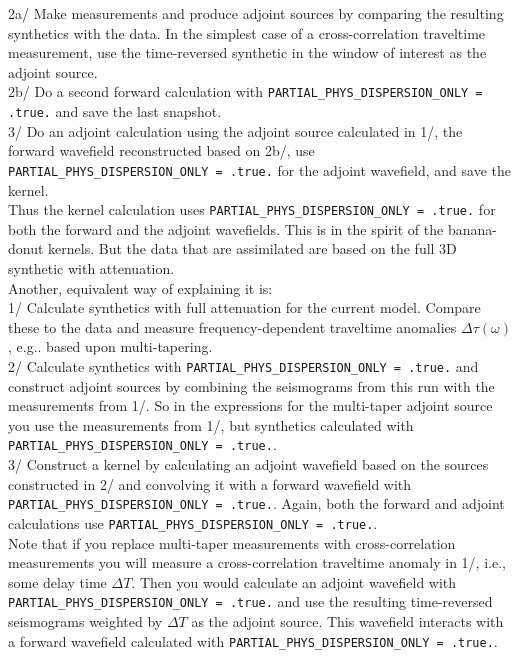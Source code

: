 \documentclass[oneside,english]{book}
\begin{document}
\begin{description}
2a/ Make measurements and produce adjoint sources by comparing the resulting synthetics with the data. In the simplest case of a cross-correlation traveltime measurement, use the time-reversed synthetic in the window of interest as the adjoint source.\\
2b/ Do a second forward calculation with \texttt{PARTIAL\_PHYS\_DISPERSION\_ONLY = .true.} and save the last snapshot.\\
3/ Do an adjoint calculation using the adjoint source calculated in 1/, the forward wavefield reconstructed based on 2b/, use \texttt{PARTIAL\_PHYS\_DISPERSION\_ONLY = .true.} for the adjoint wavefield, and save the kernel.\\
Thus the kernel calculation uses \texttt{PARTIAL\_PHYS\_DISPERSION\_ONLY = .true.} for both the forward and the adjoint wavefields. This is in the spirit of the banana-donut kernels. But the data that are assimilated are based on the full 3D synthetic with attenuation.\\
%
Another, equivalent way of explaining it is:\\
1/ Calculate synthetics with full attenuation for the current model. Compare these to the data and measure frequency-dependent traveltime anomalies $\Delta \tau(\omega)$, e.g.. based upon multi-tapering.\\
2/ Calculate synthetics with \texttt{PARTIAL\_PHYS\_DISPERSION\_ONLY = .true.} and construct adjoint sources by combining the seismograms from this run with the measurements from 1/. So in the expressions for the multi-taper adjoint source you use the measurements from 1/, but synthetics calculated with \texttt{PARTIAL\_PHYS\_DISPERSION\_ONLY = .true.}.\\
3/ Construct a kernel by calculating an adjoint wavefield based on the sources constructed in 2/ and convolving it with a forward wavefield with \texttt{PARTIAL\_PHYS\_DISPERSION\_ONLY = .true.}. Again, both the forward and adjoint calculations use \texttt{PARTIAL\_PHYS\_DISPERSION\_ONLY = .true.}.\\
Note that if you replace multi-taper measurements with cross-correlation measurements you will measure a cross-correlation traveltime anomaly in 1/, i.e., some delay time $\Delta T$. Then you would calculate an adjoint wavefield with \texttt{PARTIAL\_PHYS\_DISPERSION\_ONLY = .true.} and use the resulting time-reversed seismograms weighted by $\Delta T$ as the adjoint source. This wavefield interacts with a forward wavefield calculated with \texttt{PARTIAL\_PHYS\_DISPERSION\_ONLY = .true.}.

\end{description}
\end{document}
